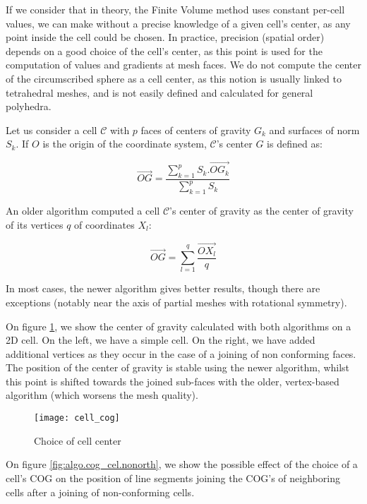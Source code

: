 If we consider that in theory, the Finite Volume method uses constant
per-cell values, we can make without a precise knowledge of a given cell's
center, as any point inside the cell could be chosen.
In practice, precision (spatial order) depends on a good choice of
the cell's center, as this point is used for the computation of values
and gradients at mesh faces.
We do not compute the center of the circumscribed sphere as
a cell center, as this notion is usually linked to tetrahedral meshes,
and is not easily defined and calculated for general polyhedra.

Let us consider a cell $\mathcal{C}$ with $p$ faces of centers of gravity
$G_k$ and surfaces of norm $S_k$. If $O$ is the origin of the coordinate
system, $\mathcal{C}$'s center $G$ is defined as:

\begin{displaymath}
\overrightarrow{OG}
= \frac{\sum_{k=1}^p S_k.\overrightarrow{OG_k}}
       {\sum_{k=1}^p S_k}
\end{displaymath}

An older algorithm computed a cell $\mathcal{C}$'s center of gravity as the
center of gravity of its vertices $q$ of coordinates $X_l$:

$$\overrightarrow{OG} = \sum_{l=1}^q \frac{\overrightarrow{OX_l}}{q}$$

In most cases, the newer algorithm gives better results, though there
are exceptions (notably near the axis of partial meshes with rotational symmetry).

On figure \ref{fig:algo.cog_cel.loc}, we show the center of gravity
calculated with both algorithms on a 2D cell. On the left, we have
a simple cell. On the right, we have added additional vertices as they
occur in the case of a joining of non conforming faces. The position
of the center of gravity is stable using the newer algorithm, whilst
this point is shifted towards the joined sub-faces with the older,
vertex-based algorithm (which worsens the mesh quality).

\begin{figure}[!h]
\centerline{
\texttt{[image: cell\_cog]}}
\caption{Choice of cell center}
\label{fig:algo.cog_cel.loc}
\end{figure}

On figure \ref{fig:algo.cog_cel.nonorth}, we show the possible effect of
the choice of a cell's COG on the position of line segments joining the COG's
of neighboring cells after a joining of non-conforming cells.

